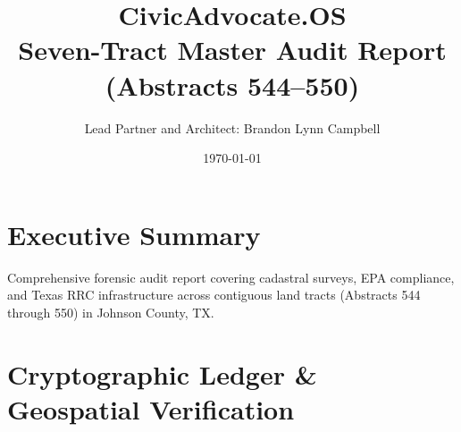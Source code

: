 \documentclass{article}
\title{CivicAdvocate.OS \\ Seven-Tract Master Audit Report (Abstracts 544--550)}
\author{Lead Partner and Architect: Brandon Lynn Campbell}
\date{\today}
\begin{document}
\maketitle

\section*{Executive Summary}
Comprehensive forensic audit report covering cadastral surveys, EPA compliance, and Texas RRC infrastructure across contiguous land tracts (Abstracts 544 through 550) in Johnson County, TX.

\section*{Cryptographic Ledger & Geospatial Verification}
\end{document}
